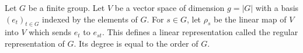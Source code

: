 Let $G$ be a finite group. Let $V$ be a vector space of dimension $g = |G|$ with a basis $(e_t)_{t \in G}$ indexed by the elements of $G$.
For $s \in G$, let $\rho_s$ be the linear map of $V$ into $V$ which sends $e_t$ to $e_{st}$.
This defines a linear representation called the regular representation of $G$. Its degree is equal to the order of $G$.
